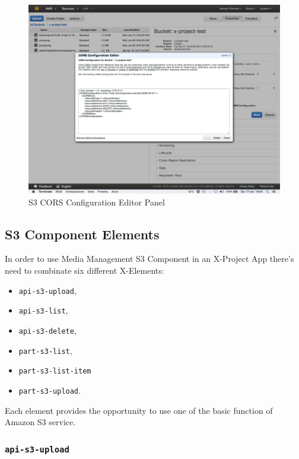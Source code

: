 \begin {figure}[h]
\graphicspath{{images/chapter_s3/}}
\includegraphics[width=\textwidth]{s3panel}
\caption{S3 CORS Configuration Editor Panel}
\end {figure}


\subsection{S3 Component Elements}
\label{subsec:S3_server_elem}


In order to use Media Management S3 Component in an X-Project App there's need to combinate six different X-Elements:
\begin{itemize}

\item\texttt{api-s3-upload},
\item\texttt{api-s3-list},
\item\texttt{api-s3-delete},
\item\texttt{part-s3-list},
\item\texttt{part-s3-list-item}
\item\texttt{part-s3-upload}.

\end{itemize}

Each element provides the opportunity to use one of the basic function of Amazon S3 service. 

\subsubsection{\texttt{api-s3-upload}}
\label{api-s3-upload}


